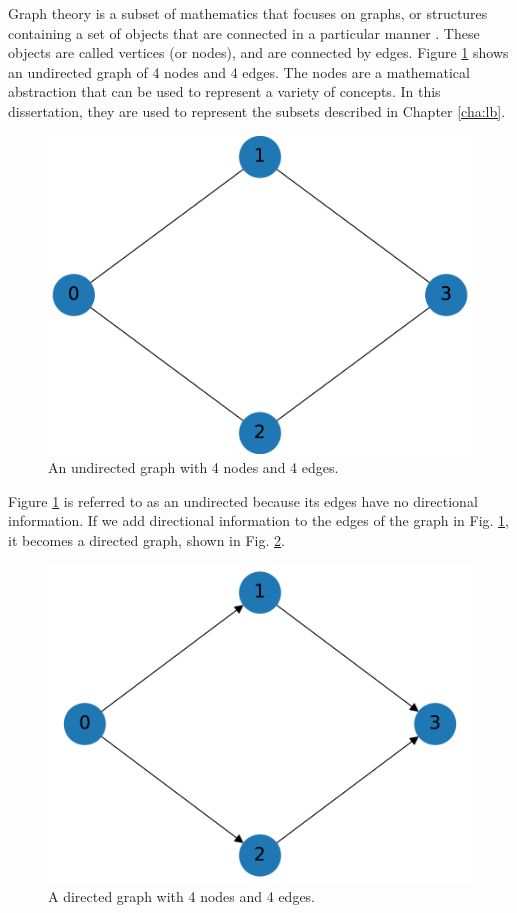 Graph theory is a subset of mathematics that focuses on graphs, or structures containing a set of objects that are connected in a particular manner \cite{graphtheory}. 
These objects are called vertices (or nodes), and are connected by edges. 
Figure \ref{basic_graph} shows an undirected graph of 4 nodes and 4 edges. The nodes are a mathematical abstraction that can be used to represent a variety of concepts. In this dissertation, they are used to represent the subsets described in Chapter \ref{cha:lb}.
\begin{figure}[H]
\centering
\includegraphics[scale=0.5]{../../figures/undirected_graph.pdf}
\caption{An undirected graph with 4 nodes and 4 edges. }
\label{basic_graph}
\end{figure}
Figure \ref{basic_graph} is referred to as an undirected because its edges have no directional information. 
If we add directional information to the edges of the graph in Fig. \ref{basic_graph}, it becomes a directed graph, shown in Fig. \ref{directed_graph}. 
\begin{figure}[H]
\centering
\includegraphics[scale=0.5]{../../figures/directed_graph.pdf}
\caption{A directed graph with 4 nodes and 4 edges. }
\label{directed_graph}
\end{figure}
